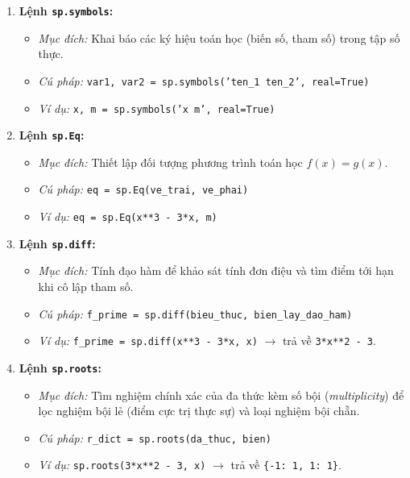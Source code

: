 \begin{enumerate}
    \item \textbf{Lệnh \texttt{sp.symbols}:}
    \begin{itemize}
        \item \textit{Mục đích:} Khai báo các ký hiệu toán học (biến số, tham số) trong tập số thực.
        \item \textit{Cú pháp:} \texttt{var1, var2 = sp.symbols('ten\_1 ten\_2', real=True)}
        \item \textit{Ví dụ:} \texttt{x, m = sp.symbols('x m', real=True)}
    \end{itemize}

    \item \textbf{Lệnh \texttt{sp.Eq}:}
    \begin{itemize}
        \item \textit{Mục đích:} Thiết lập đối tượng phương trình toán học $f(x) = g(x)$.
        \item \textit{Cú pháp:} \texttt{eq = sp.Eq(ve\_trai, ve\_phai)}
        \item \textit{Ví dụ:} \texttt{eq = sp.Eq(x**3 - 3*x, m)}
    \end{itemize}

    \item \textbf{Lệnh \texttt{sp.diff}:}
    \begin{itemize}
        \item \textit{Mục đích:} Tính đạo hàm để khảo sát tính đơn điệu và tìm điểm tới hạn khi cô lập tham số.
        \item \textit{Cú pháp:} \texttt{f\_prime = sp.diff(bieu\_thuc, bien\_lay\_dao\_ham)}
        \item \textit{Ví dụ:} \texttt{f\_prime = sp.diff(x**3 - 3*x, x)} $\rightarrow$ trả về \texttt{3*x**2 - 3}.
    \end{itemize}

    \item \textbf{Lệnh \texttt{sp.roots}:}
    \begin{itemize}
        \item \textit{Mục đích:} Tìm nghiệm chính xác của đa thức kèm số bội (\textit{multiplicity}) để lọc nghiệm bội lẻ (điểm cực trị thực sự) và loại nghiệm bội chẵn.
        \item \textit{Cú pháp:} \texttt{r\_dict = sp.roots(da\_thuc, bien)}
        \item \textit{Ví dụ:} \texttt{sp.roots(3*x**2 - 3, x)} $\rightarrow$ trả về \texttt{\{-1: 1, 1: 1\}}.
    \end{itemize}


\end{enumerate}
